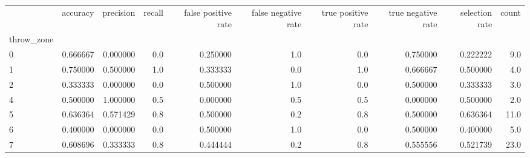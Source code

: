 \begin{tabular}{lrrrrrrrrr}
\toprule
{} &  accuracy &  precision &  recall &  false positive rate &  false negative rate &  true positive rate &  true negative rate &  selection rate &  count \\
throw\_zone &           &            &         &                      &                      &                     &                     &                 &        \\
\midrule
0          &  0.666667 &   0.000000 &     0.0 &             0.250000 &                  1.0 &                 0.0 &            0.750000 &        0.222222 &    9.0 \\
1          &  0.750000 &   0.500000 &     1.0 &             0.333333 &                  0.0 &                 1.0 &            0.666667 &        0.500000 &    4.0 \\
2          &  0.333333 &   0.000000 &     0.0 &             0.500000 &                  1.0 &                 0.0 &            0.500000 &        0.333333 &    3.0 \\
4          &  0.500000 &   1.000000 &     0.5 &             0.000000 &                  0.5 &                 0.5 &            0.000000 &        0.500000 &    2.0 \\
5          &  0.636364 &   0.571429 &     0.8 &             0.500000 &                  0.2 &                 0.8 &            0.500000 &        0.636364 &   11.0 \\
6          &  0.400000 &   0.000000 &     0.0 &             0.500000 &                  1.0 &                 0.0 &            0.500000 &        0.400000 &    5.0 \\
7          &  0.608696 &   0.333333 &     0.8 &             0.444444 &                  0.2 &                 0.8 &            0.555556 &        0.521739 &   23.0 \\
\bottomrule
\end{tabular}
